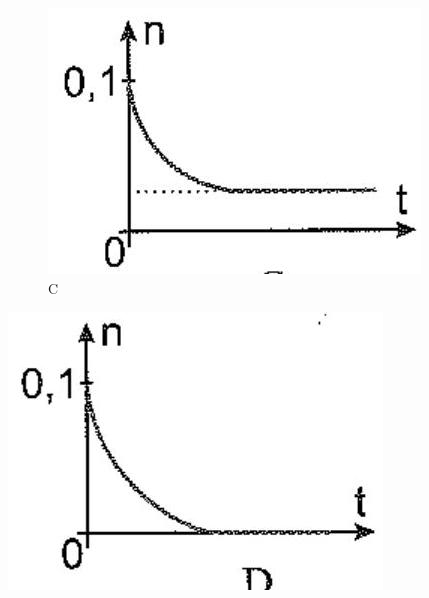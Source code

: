 \documentclass[10pt]{article}
\begin{document}
\begin{figure}[h]
\begin{center}
  \includegraphics[width=\textwidth]{2025_10_23_74efce88ce3a451fd6b0g-004(1)}
\captionsetup{labelformat=empty}
\caption{C}
\end{center}
\end{figure}

\begin{center}
\includegraphics[max width=\textwidth]{2025_10_23_74efce88ce3a451fd6b0g-004(3)}
\end{center}
\end{document}
